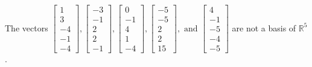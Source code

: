 \begin{exercise}
\begin{exerciseStatement}
  \end{exerciseStatement}
  \begin{exerciseAnswer}
   The vectors \(\left[\begin{array}{r}
1 \\
3 \\
-4 \\
-1 \\
-4
\end{array}\right] , \left[\begin{array}{r}
-3 \\
-1 \\
2 \\
2 \\
-1
\end{array}\right] , \left[\begin{array}{r}
0 \\
-1 \\
4 \\
1 \\
-4
\end{array}\right] , \left[\begin{array}{r}
-5 \\
-5 \\
2 \\
2 \\
15
\end{array}\right] , \text{ and } \left[\begin{array}{r}
4 \\
-1 \\
-5 \\
-4 \\
-5
\end{array}\right]\) 
  	 are not  a basis of \(\mathbb{R}^5\).
  


  \end{exerciseAnswer}
\end{exercise}